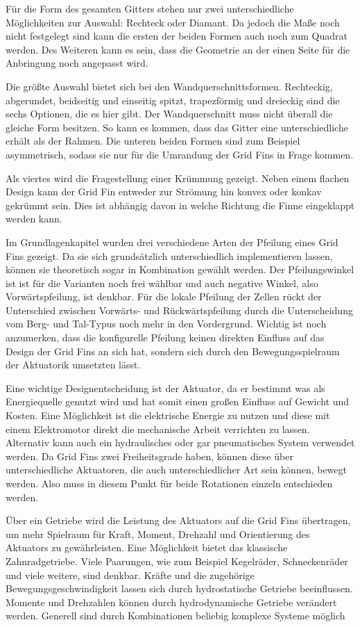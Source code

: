 Für die Form des gesamten Gitters stehen nur zwei unterschiedliche Möglichkeiten zur Auswahl: Rechteck oder Diamant. Da jedoch die Maße noch nicht festgelegt sind kann die ersten der beiden Formen auch noch zum Quadrat werden. Des Weiteren kann es sein, dass die Geometrie an der einen Seite für die Anbringung noch angepasst wird.

Die größte Auswahl bietet sich bei den Wandquerschnittsformen. Rechteckig, abgerundet, beidseitig und einseitig spitzt, trapezförmig und dreieckig sind die sechs Optionen, die es hier gibt. Der Wandquerschnitt muss nicht überall die gleiche Form besitzen. So kann es kommen, dass das Gitter eine unterschiedliche erhält als der Rahmen. Die unteren beiden Formen sind zum Beispiel asymmetrisch, sodass sie nur für die Umrandung der Grid Fins in Frage kommen.

Als viertes wird die Fragestellung einer Krümmung gezeigt. Neben einem flachen Design kann der Grid Fin entweder zur Strömung hin konvex oder konkav gekrümmt sein. Dies ist abhängig davon in welche Richtung die Finne eingeklappt werden kann.

Im Grundlagenkapitel wurden drei verschiedene Arten der Pfeilung eines Grid Fins gezeigt. Da sie sich grundsätzlich unterschiedlich implementieren lassen, können sie theoretisch sogar in Kombination gewählt werden. Der Pfeilungswinkel ist ist für die Varianten noch frei wählbar und auch negative Winkel, also Vorwärtspfeilung, ist denkbar. Für die lokale Pfeilung der Zellen rückt der Unterschied zwischen Vorwärts- und Rückwärtspfeilung durch die Unterscheidung vom Berg- und Tal-Typus noch mehr in den Vordergrund. Wichtig ist noch anzumerken, dass die konfigurelle Pfeilung keinen direkten Einfluss auf das Design der Grid Fins an sich hat, sondern sich durch den Bewegungsspielraum der Aktuatorik umsetzten lässt.

Eine wichtige Designentscheidung ist der Aktuator, da er bestimmt was als Energiequelle genutzt wird und hat somit einen großen Einfluss auf Gewicht und Kosten. Eine Möglichkeit ist die elektrische Energie zu nutzen und diese mit einem Elektromotor direkt die mechanische Arbeit verrichten zu lassen. Alternativ kann auch ein hydraulisches oder gar pneumatisches System verwendet werden. Da Grid Fins zwei Freiheitsgrade haben, können diese über unterschiedliche Aktuatoren, die auch unterschiedlicher Art sein können, bewegt werden. Also muss in diesem Punkt für beide Rotationen einzeln entschieden werden.

Über ein Getriebe wird die Leistung des Aktuators auf die Grid Fins übertragen, um mehr Spielraum für Kraft, Moment, Drehzahl und Orientierung des Aktuators zu gewährleisten. Eine Möglichkeit bietet das klassische Zahnradgetriebe. Viele Paarungen, wie zum Beispiel Kegelräder, Schneckenräder und viele weitere, sind denkbar. Kräfte und die zugehörige Bewegungsgeschwindigkeit lassen sich durch hydrostatische Getriebe beeinflussen. Momente und Drehzahlen können durch hydrodynamische Getriebe verändert werden. Generell sind durch Kombinationen beliebig komplexe Systeme möglich

